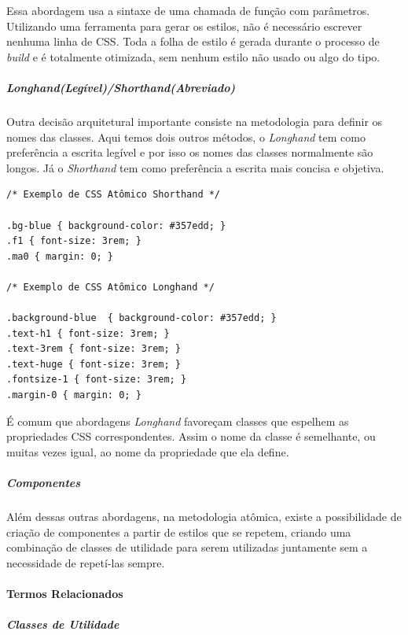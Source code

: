 Essa abordagem usa a sintaxe de uma chamada de função com parâmetros.
Utilizando uma ferramenta para gerar os estilos, não é necessário
escrever nenhuma linha de CSS. Toda a folha de estilo é gerada durante o
processo de \emph{build} e é totalmente otimizada, sem nenhum estilo não
usado ou algo do tipo.

\hypertarget{longhandleguxedvelshorthandabreviado}{%
\subparagraph{\texorpdfstring{\emph{Longhand}(Legível)/\emph{Shorthand}(Abreviado)}{Longhand(Legível)/Shorthand(Abreviado)}}\label{longhandleguxedvelshorthandabreviado}}

Outra decisão arquitetural importante consiste na metodologia para
definir os nomes das classes. Aqui temos dois outros métodos, o
\emph{Longhand} tem como preferência a escrita legível e por isso os
nomes das classes normalmente são longos. Já o \emph{Shorthand} tem como
preferência a escrita mais concisa e objetiva.

\begin{verbatim}
/* Exemplo de CSS Atômico Shorthand */

.bg-blue { background-color: #357edd; }
.f1 { font-size: 3rem; }
.ma0 { margin: 0; }

/* Exemplo de CSS Atômico Longhand */

.background-blue  { background-color: #357edd; }
.text-h1 { font-size: 3rem; }
.text-3rem { font-size: 3rem; }
.text-huge { font-size: 3rem; }
.fontsize-1 { font-size: 3rem; }
.margin-0 { margin: 0; }
\end{verbatim}

É comum que abordagens \emph{Longhand} favoreçam classes que espelhem as
propriedades CSS correspondentes. Assim o nome da classe é semelhante,
ou muitas vezes igual, ao nome da propriedade que ela define.

\hypertarget{componentes}{%
\subparagraph{Componentes}\label{componentes}}

Além dessas outras abordagens, na metodologia atômica, existe a possibilidade de criação de componentes a partir de estilos que se repetem, criando uma combinação de classes de utilidade para serem utilizadas juntamente sem a necessidade de repetí-las sempre.

\hypertarget{termos-relacionados}{%
\paragraph{Termos Relacionados}\label{termos-relacionados}}

\hypertarget{classes-de-utilidade}{%
\subparagraph{Classes de Utilidade}\label{classes-de-utilidade}}

